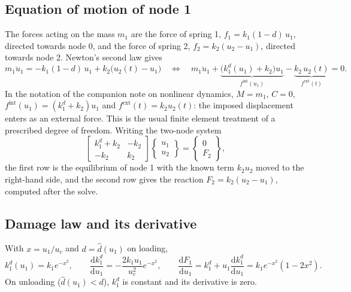 \documentclass[11pt,a4paper]{article}
\newcommand{\dd}{\mathrm{d}}
\newcommand{\kd}{k_1^{d}}
\begin{document}
\subsection{Equation of motion of node 1}
The forces acting on the mass $m_1$ are the force of spring 1, $f_1 = k_1(1-d)\,u_1$, directed
towards node 0, and the force of spring 2, $f_2 = k_2(u_2-u_1)$, directed towards node 2.
Newton's second law gives
\begin{equation}
  m_1\ddot u_1 = -k_1(1-d)\,u_1 + k_2\bigl(u_2(t)-u_1\bigr)
  \quad\Longleftrightarrow\quad
  m_1\ddot u_1 + \underbrace{\bigl(\kd(u_1)+k_2\bigr)u_1}_{f^{\text{int}}(u_1)}
  - \underbrace{k_2\,u_2(t)}_{f^{\text{ext}}(t)} = 0 .
  \label{eq:motion}
\end{equation}
In the notation of the companion note on nonlinear dynamics, $M = m_1$, $C = 0$,
$f^{\text{int}}(u_1) = (\kd+k_2)u_1$ and $f^{\text{ext}}(t) = k_2u_2(t)$: the imposed displacement
enters as an external force. This is the usual finite element treatment of a prescribed degree
of freedom. Writing the two-node system
\begin{equation}
  \begin{bmatrix} \kd+k_2 & -k_2\\ -k_2 & k_2\end{bmatrix}
  \begin{Bmatrix}u_1\\u_2\end{Bmatrix} = \begin{Bmatrix}0\\F_2\end{Bmatrix},
\end{equation}
the first row is the equilibrium of node 1 with the known term $k_2u_2$ moved to the right-hand
side, and the second row gives the reaction $F_2 = k_2(u_2-u_1)$, computed after the solve.

\subsection{Damage law and its derivative}
With $x = u_1/u_c$ and $d = \hat d(u_1)$ on loading,
\begin{equation}
  \kd(u_1) = k_1e^{-x^2},\qquad
  \frac{\dd\kd}{\dd u_1} = -\frac{2k_1u_1}{u_c^2}e^{-x^2},\qquad
  \frac{\dd F_1}{\dd u_1} = \kd + u_1\frac{\dd\kd}{\dd u_1} = k_1e^{-x^2}(1-2x^2).
  \label{eq:dkd}
\end{equation}
On unloading ($\hat d(u_1) < d$), $\kd$ is constant and its derivative is zero.
\end{document}
